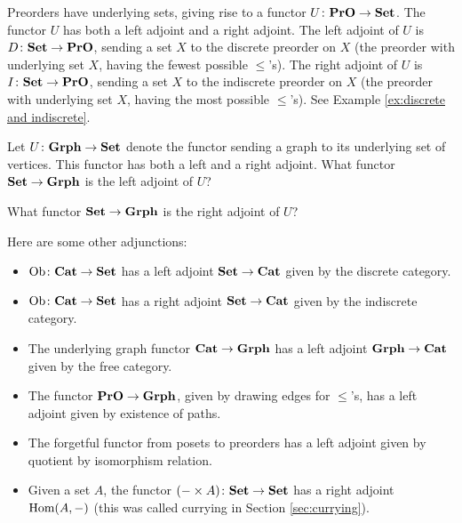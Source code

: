 \documentclass[CT4S-EN-RU]{subfiles}
\begin{document}
\begin{example}

Preorders have underlying sets, giving rise to a functor $U\colon{\bf PrO}\rightarrow{\bf Set}$. The functor $U$ has both a left adjoint and a right adjoint. The left adjoint of $U$ is $D\colon{\bf Set}\rightarrow{\bf PrO}$, sending a set $X$ to the discrete preorder on $X$ (the preorder with underlying set $X$, having the fewest possible $\leq$'s). The right adjoint of $U$ is $I\colon{\bf Set}\rightarrow{\bf PrO}$, sending a set $X$ to the indiscrete preorder on $X$ (the preorder with underlying set $X$, having the most possible $\leq$'s). See Example \ref{ex:discrete and indiscrete}. 

\end{example}

\begin{exercise}
Let $U\colon{\bf Grph}\rightarrow{\bf Set}$ denote the functor sending a graph to its underlying set of vertices. This functor has both a left and a right adjoint. 
\sexc What functor ${\bf Set}\rightarrow{\bf Grph}$ is the left adjoint of $U$?
\item What functor ${\bf Set}\rightarrow{\bf Grph}$ is the right adjoint of $U$?
\endsexc
\end{exercise}

\begin{example}\label{ex:other adjunctions}

Here are some other adjunctions:

\begin{itemize}
\item $\textnormal{Ob}\colon{\bf Cat}\rightarrow{\bf Set}$ has a left adjoint ${\bf Set}\rightarrow{\bf Cat}$ given by the discrete category.
\item $\textnormal{Ob}\colon{\bf Cat}\rightarrow{\bf Set}$ has a right adjoint ${\bf Set}\rightarrow{\bf Cat}$ given by the indiscrete category.
\item The underlying graph functor ${\bf Cat}\rightarrow{\bf Grph}$ has a left adjoint ${\bf Grph}\rightarrow{\bf Cat}$ given by the free category.
\item The functor ${\bf PrO}\rightarrow{\bf Grph}$,  given by drawing edges for $\leq$'s, has a left adjoint given by existence of paths.
\item The forgetful functor from posets to preorders has a left adjoint given by quotient by isomorphism relation.
\item Given a set $A$, the functor $(-\times A)\colon{\bf Set}\rightarrow{\bf Set}$ has a right adjoint $\textnormal{Hom}(A,-)$ (this was called currying in Section \ref{sec:currying}). 
\end{itemize}

\end{example}
\end{document}
